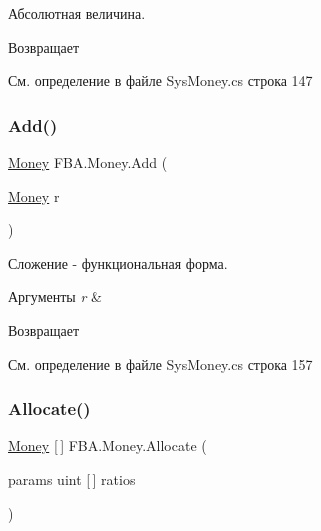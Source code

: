 Абсолютная величина. ~\newline


\begin{DoxyReturn}{Возвращает}

\end{DoxyReturn}


См. определение в файле Sys\+Money.\+cs строка 147

\mbox{\label{struct_f_b_a_1_1_money_ae2c24b55b6e82bbe7255488a77d321c5}} 
\subsubsection{\texorpdfstring{Add()}{Add()}}
{\footnotesize\ttfamily \mbox{\hyperlink{struct_f_b_a_1_1_money}{Money}} F\+B\+A.\+Money.\+Add (\begin{DoxyParamCaption}\item[{\mbox{\hyperlink{struct_f_b_a_1_1_money}{Money}}}]{r }\end{DoxyParamCaption})}



Сложение -\/ функциональная форма. ~\newline



\begin{DoxyParams}{Аргументы}
{\em r} & \\
\hline
\end{DoxyParams}
\begin{DoxyReturn}{Возвращает}

\end{DoxyReturn}


См. определение в файле Sys\+Money.\+cs строка 157

\mbox{\label{struct_f_b_a_1_1_money_aff15a479a5f4738af933f84a8bc8ef51}} 
\subsubsection{\texorpdfstring{Allocate()}{Allocate()}}
{\footnotesize\ttfamily \mbox{\hyperlink{struct_f_b_a_1_1_money}{Money}} \mbox{[}$\,$\mbox{]} F\+B\+A.\+Money.\+Allocate (\begin{DoxyParamCaption}\item[{params uint \mbox{[}$\,$\mbox{]}}]{ratios }\end{DoxyParamCaption})}



